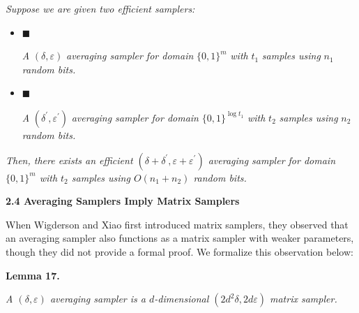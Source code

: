 \documentclass[10pt,a4paper]{article}
\begin{document}
\emph{Suppose we are given two efficient samplers:}\par


\begin{itemize}


\item[] 
$\blacksquare$ 


\emph{A }$(\delta,\varepsilon)$\emph{ averaging sampler for domain }$\{0,1\}^{m}$\emph{ with }$t_{1}$\emph{ samples using }$n_{1}$\emph{ random bits.}\par





\item[] 
$\blacksquare$ 


\emph{A }$(\delta^{\prime},\varepsilon^{\prime})$\emph{ averaging sampler for domain }$\{0,1\}^{\log t_{1}}$\emph{ with }$t_{2}$\emph{ samples using }$n_{2}$\emph{ random bits.}\par





\end{itemize}


\emph{Then, there exists an efficient $(\delta+\delta^{\prime},\varepsilon+\varepsilon^{\prime})$ averaging sampler for domain $\{0,1\}^{m}$ with $t_{2}$ samples using $O(n_{1}+n_{2})$ random bits.}\par







\par\medskip\noindent\textbf{
2.4 Averaging Samplers Imply Matrix Samplers}\par




When Wigderson and Xiao first introduced matrix samplers, they observed that an averaging sampler also functions as a matrix sampler with weaker parameters, though they did not provide a formal proof. We formalize this observation below:\par





\par\medskip\noindent\textbf{
\textbf{Lemma 17}\textbf{.}
}\par



\emph{A $(\delta,\varepsilon)$ averaging sampler is a $d$-dimensional $(2d^{2}\delta,2d\varepsilon)$ matrix sampler.}\par
\end{document}
